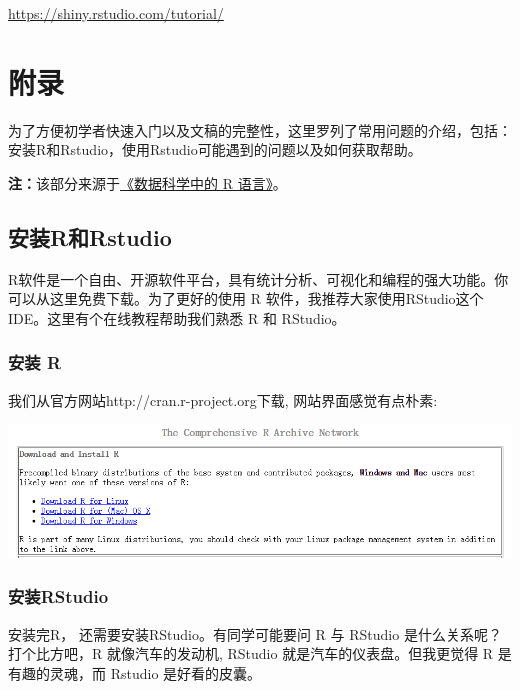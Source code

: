 \documentclass[
]{book}
\begin{document}
\url{https://shiny.rstudio.com/tutorial/}

\hypertarget{appendix}{%
\chapter{附录}\label{appendix}}

为了方便初学者快速入门以及文稿的完整性，这里罗列了常用问题的介绍，包括：安装R和Rstudio，使用Rstudio可能遇到的问题以及如何获取帮助。

\textbf{注：}该部分来源于\href{https://bookdown.org/wangminjie/R4DS/intro-R.html\#\%E5\%A6\%82\%E4\%BD\%95\%E8\%8E\%B7\%E5\%8F\%96\%E5\%B8\%AE\%E5\%8A\%A9}{《数据科学中的 R 语言》}。

\hypertarget{ux5b89ux88c5rux548crstudio}{%
\section*{安装R和Rstudio}\label{ux5b89ux88c5rux548crstudio}}

R软件是一个自由、开源软件平台，具有统计分析、可视化和编程的强大功能。你可以从这里免费下载。为了更好的使用 R 软件，我推荐大家使用RStudio这个IDE。这里有个在线教程帮助我们熟悉 R 和 RStudio。

\hypertarget{ux5b89ux88c5-r}{%
\subsection*{安装 R}\label{ux5b89ux88c5-r}}

我们从官方网站http://cran.r-project.org下载, 网站界面感觉有点朴素:

\includegraphics{figure/Rinstall.png}

\hypertarget{ux5b89ux88c5rstudio}{%
\subsection*{安装RStudio}\label{ux5b89ux88c5rstudio}}

安装完R， 还需要安装RStudio。有同学可能要问 R 与 RStudio 是什么关系呢？打个比方吧，R 就像汽车的发动机, RStudio 就是汽车的仪表盘。但我更觉得 R 是有趣的灵魂，而 Rstudio 是好看的皮囊。
\end{document}
